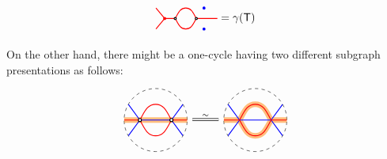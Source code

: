 \begin{remark}
\[\begin{tikzcd}
\begin{tikzpicture}[baseline=-.5ex,scale=0.667]
\begin{scope}
\draw [red,thick] ({-1.5*2*sqrt(2)/3},{1.5*1/3}) to (-1,0);
\draw [red,thick] ({-1.5*2*sqrt(2)/3},{-1.5*1/3}) to (-1,0);
\draw [red, thick] (-1,0)--(-1/2,0) to[out=60,in=180] (0,1/2) to[out=0,in=120] (1/2,0)--(1.5,0);
\draw [red, thick] (-1/2,0) to[out=-60,in=180] (0, -1/2) to[out=0, in=-120] (1/2,0); 

\draw[thick,black,fill=white] (-1/2,0) circle (0.05);
\draw[thick,black,fill=white] (1/2,0) circle (0.05);
\draw[thick,red,fill=red] (-1,0) circle (0.05);
\draw[thick,blue,fill=blue] ({sqrt(3)/2},1/2) circle (0.05);
\draw[thick,blue,fill=blue] ({sqrt(3)/2},-1/2) circle (0.05);
\end{scope}
\end{tikzpicture}=\cycle(\sfT)
\end{tikzcd}
\]

On the other hand, there might be a one-cycle having two different subgraph presentations as follows:
\[
\begin{tikzcd}
\begin{tikzpicture}[baseline=-.5ex]
\draw [dashed] (0,0) circle [radius=1];%
\clip (0,0) circle (1);
\draw [color=cyclecolor1, line cap=round, line width=5, opacity=0.5] (-1,0) to (1,0);
\draw [blue, thick] ({-sqrt(3)/2},1/2)--(-1/2,0);
\draw [blue, thick] ({-sqrt(3)/2},-1/2)--(-1/2,0);
\draw [blue, thick] ({sqrt(3)/2},1/2)--(1/2,0);
\draw [blue, thick] ({sqrt(3)/2},-1/2)--(1/2,0);
\draw [blue, thick] (-1/2,0)--(1/2,0);
\draw [red, thick] (-1,0)--(-1/2,0) to[out=60,in=180] (0,1/2) to[out=0,in=120] (1/2,0)--(1,0);
\draw [red, thick] (-1/2,0) to[out=-60,in=180] (0, -1/2) to[out=0, in=-120] (1/2,0); 
\draw[thick,black,fill=white] (-1/2,0) circle (0.05);
\draw[thick,black,fill=white] (1/2,0) circle (0.05);
\end{tikzpicture}
\arrow[equal, r, "\sim"]&
\begin{tikzpicture}[baseline=-.5ex]
\draw [dashed] (3,0) circle [radius=1];%
\clip (3,0) circle (1);
\draw [color=cyclecolor1, line cap=round, line width=5, opacity=0.5] 
(2,0) -- (2.5,0) to[out=60,in=180] (3,1/2) to[out=0,in=120] (3.5,0)-- (4,0)
(2.5,0) to[out=-60,in=-180] (3,-1/2) to[out=0,in=-120] (3.5,0);
\begin{scope}[xshift=3cm]
\draw [blue, thick] ({-sqrt(3)/2},1/2)--(-1/2,0);
\draw [blue, thick] ({-sqrt(3)/2},-1/2)--(-1/2,0);
\draw [blue, thick] ({sqrt(3)/2},1/2)--(1/2,0);
\draw [blue, thick] ({sqrt(3)/2},-1/2)--(1/2,0);
\draw [blue, thick] (-1/2,0)--(1/2,0);

\draw [red, thick] (-1,0)--(-1/2,0) to[out=60,in=180] (0,1/2) to[out=0,in=120] (1/2,0)--(1,0);
\draw [red, thick] (-1/2,0) to[out=-60,in=180] (0, -1/2) to[out=0, in=-120] (1/2,0); 


\end{scope}
\end{tikzpicture}
\end{tikzcd}\]
\end{remark}
